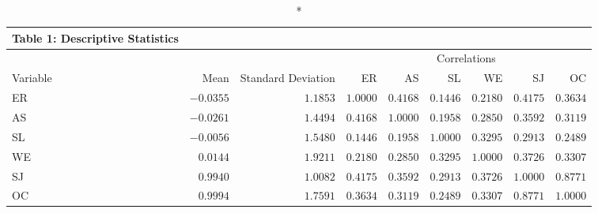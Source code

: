 \begin{longtable}{lrrrrrrrr}
\caption*{
{\large Table 1: Descriptive Statistics}
} \\ 
\toprule
 &  &  & \multicolumn{6}{c}{Correlations} \\ 
\cmidrule(lr){4-9}
Variable & Mean & Standard Deviation & ER & AS & SL & WE & SJ & OC \\ 
\midrule
ER & $-0.0355$ & $1.1853$ & $1.0000$ & $0.4168$ & $0.1446$ & $0.2180$ & $0.4175$ & $0.3634$ \\ 
AS & $-0.0261$ & $1.4494$ & $0.4168$ & $1.0000$ & $0.1958$ & $0.2850$ & $0.3592$ & $0.3119$ \\ 
SL & $-0.0056$ & $1.5480$ & $0.1446$ & $0.1958$ & $1.0000$ & $0.3295$ & $0.2913$ & $0.2489$ \\ 
WE & $0.0144$ & $1.9211$ & $0.2180$ & $0.2850$ & $0.3295$ & $1.0000$ & $0.3726$ & $0.3307$ \\ 
SJ & $0.9940$ & $1.0082$ & $0.4175$ & $0.3592$ & $0.2913$ & $0.3726$ & $1.0000$ & $0.8771$ \\ 
OC & $0.9994$ & $1.7591$ & $0.3634$ & $0.3119$ & $0.2489$ & $0.3307$ & $0.8771$ & $1.0000$ \\ 
\bottomrule
\end{longtable}

